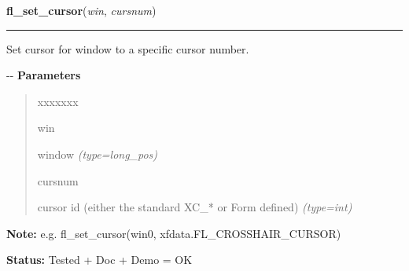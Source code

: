     \vspace{0.5ex}

\hspace{.8\funcindent}\begin{boxedminipage}{\funcwidth}

    \raggedright \textbf{fl\_set\_cursor}(\textit{win}, \textit{cursnum})

    \vspace{-1.5ex}

    \rule{\textwidth}{0.5\fboxrule}
\setlength{\parskip}{2ex}

Set cursor for window to a specific cursor number.

-{}-
\setlength{\parskip}{1ex}
      \textbf{Parameters}
      \vspace{-1ex}

      \begin{quote}
        \begin{Ventry}{xxxxxxx}

          \item[win]


window
            {\it (type=long\_pos)}

          \item[cursnum]


cursor id (either the standard XC\_* or Form defined)
            {\it (type=int)}

        \end{Ventry}

      \end{quote}

\textbf{Note:} 
e.g. fl\_set\_cursor(win0, xfdata.FL\_CROSSHAIR\_CURSOR)


\textbf{Status:} 
Tested + Doc + Demo = OK


    \end{boxedminipage}

    \label{xformslib:flcursor:fl_set_cursor_color}

    \vspace{0.5ex}

